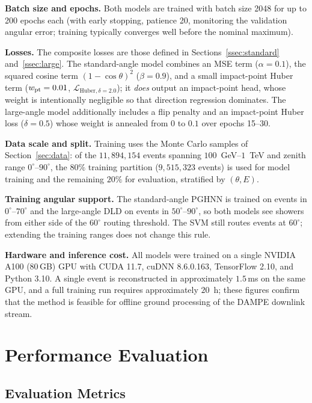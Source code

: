 \documentclass[preprint,12pt]{elsarticle}
\begin{document}
\textbf{Batch size and epochs.} Both models are trained with batch size 2048 for up to 200 epochs each (with early stopping, patience 20, monitoring the validation angular error; training typically converges well before the nominal maximum).

\textbf{Losses.} The composite losses are those defined in Sections~\ref{ssec:standard} and~\ref{ssec:large}. The standard-angle model combines an MSE term ($\alpha=0.1$), the squared cosine term $(1-\cos\theta)^2$ ($\beta=0.9$), and a small impact-point Huber term ($w_{\rm pt}=0.01$, $\mathcal{L}_{\text{Huber},\delta=2.0}$); it \emph{does} output an impact-point head, whose weight is intentionally negligible so that direction regression dominates. The large-angle model additionally includes a flip penalty and an impact-point Huber loss ($\delta=0.5$) whose weight is annealed from $0$ to $0.1$ over epochs 15–30.

\textbf{Data scale and split.} Training uses the Monte Carlo samples of Section~\ref{sec:data}: of the $11{,}894{,}154$ events spanning $100$~GeV--$1$~TeV and zenith range $0^{\circ}$--$90^{\circ}$, the $80\%$ training partition ($9{,}515{,}323$ events) is used for model training and the remaining $20\%$ for evaluation, stratified by $(\theta,E)$.

\textbf{Training angular support.} The standard-angle PGHNN is trained on
events in $0^{\circ}$--$70^{\circ}$ and the large-angle DLD on events in
$50^{\circ}$--$90^{\circ}$, so both models see showers from either side of
the $60^{\circ}$ routing threshold. The SVM still routes events at
$60^{\circ}$; extending the training ranges does not change this rule.

\textbf{Hardware and inference cost.} All models were trained on a single NVIDIA A100 (80\,GB) GPU with CUDA 11.7, cuDNN 8.6.0.163, TensorFlow 2.10, and Python 3.10. A single event is reconstructed in approximately $1.5$\,ms on the same GPU, and a full training run requires approximately $20$~h; these figures confirm that the method is feasible for offline ground processing of the DAMPE downlink stream.

\FloatBarrier
\section{Performance Evaluation}
\label{sec:eval}

\subsection{Evaluation Metrics}
\end{document}
